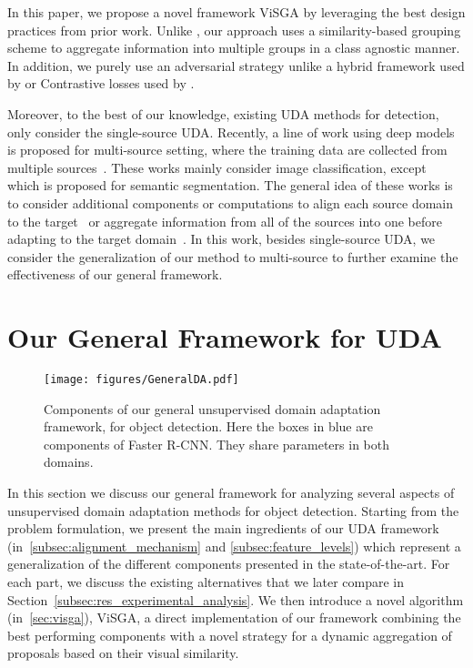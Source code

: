 \documentclass[10pt,twocolumn,letterpaper]{article}
\DeclareRobustCommand{\secref}[1]{Section~\ref{#1}}
\def\ourda{ViSGA\xspace}
\begin{document}
In this paper, we propose a novel framework \ourda by leveraging the best design practices from prior work. Unlike \cite{GPA, zheng_cvpr20_prototype}, our approach uses a similarity-based grouping scheme to aggregate information into multiple groups in a class agnostic manner. In addition, we purely use an adversarial strategy unlike a hybrid framework used by \cite{zheng_cvpr20_prototype} or Contrastive losses used by \cite{GPA}. 

Moreover, to the best of our knowledge, existing UDA methods for detection, only consider the single-source UDA. Recently, a line of work using deep models is proposed for multi-source setting, where the training data are collected from multiple sources~\cite{multipeng2019moment, multixu2018deep, multizhao2018adversarial, multizhao2019}. These works mainly consider image classification, except~\cite{multipeng2019moment} which is proposed for semantic segmentation. The general idea of these works is to consider additional components or computations to align each source domain to the target~\cite{ multixu2018deep, multizhao2018adversarial, multizhao2019} or aggregate information from all of the sources into one before adapting to the target domain~\cite{multipeng2019moment}. In this work, besides single-source UDA, we consider the generalization of our method to multi-source to further examine the effectiveness of our general framework. 
\section{Our General Framework for UDA}
\label{sec:components}
\begin{figure*}[t]
	\centering
	\texttt{[image: figures/GeneralDA.pdf]}
	\caption{Components of our general unsupervised domain adaptation framework, for object detection. Here the boxes in blue are components of Faster R-CNN. They share parameters in both domains.
	} 
	\label{fig:overall}
	\vspace{-3mm}
\end{figure*}

In this section we discuss our general framework for analyzing several aspects of unsupervised domain adaptation methods for object detection.
Starting from the problem formulation, we present the main ingredients of our UDA framework (in~\ref{subsec:alignment_mechanism} and \ref{subsec:feature_levels}) which represent a generalization of the different components presented in the state-of-the-art. For each part, we discuss the existing alternatives that we later compare in \secref{subsec:res_experimental_analysis}.
We then introduce a novel algorithm (in~\ref{sec:visga}), \ourda, a direct implementation of our framework combining the best performing components 
with a novel strategy for a dynamic aggregation of  proposals based on their visual similarity.
\end{document}
